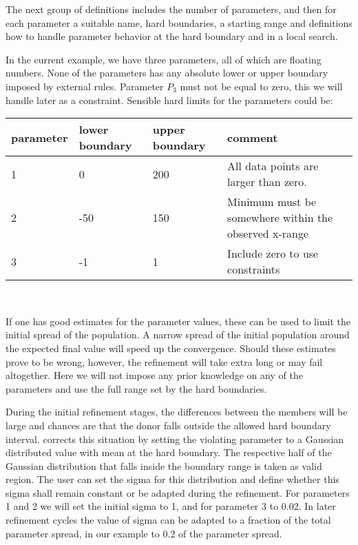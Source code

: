 The next group of definitions includes the number of parameters,
and then for each parameter a suitable name, hard boundaries, a
starting range and definitions how to handle parameter behavior 
at the hard boundary and in a local search.

In the current example, we have three parameters, all of which are 
floating numbers. None of the parameters has any absolute lower or
upper boundary imposed by external rules. Parameter $P_{3}$ must
not be equal to zero, this we will handle later as a constraint.
Sensible hard limits for the parameters could be:\\
\begin{tabular}{lp{2cm}p{2cm}p{8cm}}
     parameter & \raggedright{lower boundary}
               & \raggedright{upper boundary}
               & comment\\
     \hline
     1 &   0 & 200 & \raggedright{All data points are larger than zero.}
                     \tabularnewline
     2 & -50 & 150 & \raggedright{Minimum must be somewhere within the 
                                  observed x-range}
                     \tabularnewline
     3 &  -1 &  1  & \raggedright{Include zero to use constraints}
\end{tabular}
\\
\par 
If one has good estimates for the parameter values, these can be used 
to limit the initial spread of the population. A narrow spread of the
initial population around the expected final value will speed up the
convergence. Should these estimates prove to be wrong, however, the 
refinement will take extra long or may fail altogether. Here we will
not impose any prior knowledge on any of the parameters and use the
full range set by the hard boundaries.

During the initial refinement stages, the differences between the 
members will be large and chances are that the donor falls outside 
the allowed hard boundary interval. \Diffev corrects this situation by 
setting the violating parameter to a Gaussian distributed value 
with mean at the hard boundary. The respective half of the Gaussian
distribution that falls inside the boundary range is taken as valid
region. The user can set the sigma for this distribution and define
whether this sigma shall remain constant or be adapted during the
refinement. For parameters 1 and 2 we will set the initial sigma to
1, and for parameter 3 to 0.02. In later refinement cycles the
value of sigma can be adapted to a fraction of the total parameter 
spread, in our example to 0.2 of the parameter spread. 

